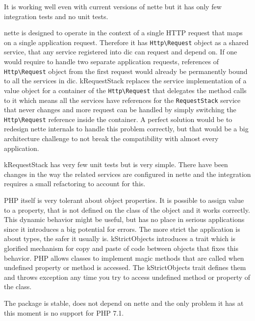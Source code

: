 It is working well even with current versions of \gls{nette} but it has only few integration tests and no unit tests.

 \label{sec:state:request-stack}

\gls{nette} is designed to operate in the context of a single HTTP request that maps on a single application request. Therefore it has \lstinline{Http\Request} object as a shared service, that any service registered into \gls{dic} can request and depend on. If one would require to handle two separate application requests, references of \lstinline{Http\Request} object from the first request would already be permanently bound to all the services in \gls{dic}. \gls{kRequestStack} replaces the service implementation of a value object for a container of the \lstinline{Http\Request} that delegates the method calls to it which means all the services have references for the \lstinline{RequestStack} service that never changes and more request can be handled by simply switching the \lstinline{Http\Request} reference inside the container. A perfect solution would be to redesign \gls{nette} internals to handle this problem correctly, but that would be a big architecture challenge to not break the compatibility with almost every application.

\gls{kRequestStack} has very few unit tests but is very simple. There have been changes in the way the related services are configured in \gls{nette} and the integration requires a small refactoring to account for this.

 \label{sec:state:strict-objects}

PHP itself is very tolerant about object properties. It is possible to assign value to a property, that is not defined on the class of the object and it works correctly. This dynamic behavior might be useful, but has no place in serious applications since it introduces a big potential for errors. The more strict the application is about types, the safer it usually is. \gls{kStrictObjects} introduces a trait which is glorified mechanism for copy and paste of code between objects that fixes this behavior. PHP allows classes to implement magic methods that are called when undefined property or method is accessed. The \gls{kStrictObjects} trait defines them and throws exception any time you try to access undefined method or property of the class.

The package is stable, does not depend on \gls{nette} and the only problem it has at this moment is no support for PHP 7.1.

